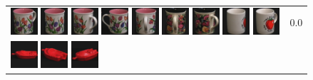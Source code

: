 {\begin{figure}[p]
\begin{tabular}{m{11cm} | m{3cm} |}
\includegraphics[width=1cm]{coil/beeld-9.eps}
\includegraphics[width=1cm]{coil/beeld-8.eps}
\includegraphics[width=1cm]{coil/beeld-10.eps}
\includegraphics[width=1cm]{coil/beeld-7.eps}
\includegraphics[width=1cm]{coil/beeld-11.eps}
\includegraphics[width=1cm]{coil/beeld-65.eps}
\includegraphics[width=1cm]{coil/beeld-64.eps}
\includegraphics[width=1cm]{coil/beeld-38.eps}
\includegraphics[width=1cm]{coil/beeld-39.eps}
& {\scriptsize 0.0}
\\
\includegraphics[width=1cm]{coil/beeld-18.eps}
\includegraphics[width=1cm]{coil/beeld-22.eps}
\includegraphics[width=1cm]{coil/beeld-21.eps}

\end{tabular}
\end{figure}}
